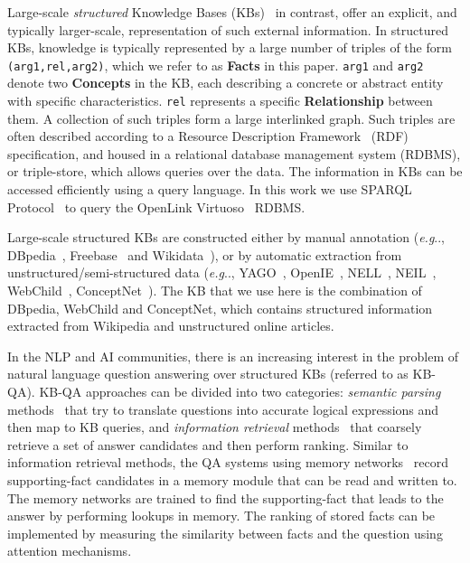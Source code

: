 \documentclass[10pt,journal]{IEEEtran}
\makeatletter
\DeclareRobustCommand\onedot{\futurelet\@let@token\@onedot}
\def\@onedot{\ifx\@let@token.\else.\null\fi\xspace}
\def\eg{\emph{e.g}\onedot} \def\Eg{\emph{E.g}\onedot}
\def\bluett{}
\makeatother
\begin{document}
Large-scale {\em structured} Knowledge Bases
(KBs)~\cite{auer2007dbpedia,banko2007open,bollacker2008freebase,carlson2010toward,chen2013neil,mahdisoltani2014yago3,vrandevcic2014wikidata}
in contrast, offer an explicit, and typically larger-scale, representation of
such external information. In structured KBs, knowledge is typically represented by a large number of triples of the form \texttt{(arg1,rel,arg2)}, which we refer to as {\bf Facts} in this paper.
\texttt{arg1} and \texttt{arg2} denote two {\bf Concepts} in the KB,
each describing a concrete or abstract entity with specific characteristics.
\texttt{rel} represents a specific {\bf Relationship} between them.
A collection of such triples form a large interlinked graph. Such triples are often described according to a Resource Description Framework~\cite{rdf2014resource} (RDF) specification, and housed in a relational database management system (RDBMS), or triple-store, which allows queries over the data.
The information in KBs can be accessed efficiently using a query language.
In this work we use SPARQL Protocol~\cite{prud2008sparql} to query the OpenLink Virtuoso~\cite{erling2012virtuoso} RDBMS.

Large-scale structured KBs are constructed either by manual annotation
(\eg, DBpedia~\cite{auer2007dbpedia}, Freebase~\cite{bollacker2008freebase} and Wikidata~\cite{vrandevcic2014wikidata}), or by automatic extraction from unstructured/semi-structured data (\eg, YAGO~\cite{hoffart2013yago2,mahdisoltani2014yago3}, OpenIE~\cite{banko2007open,etzioni2011open,fader2011identifying}, NELL~\cite{carlson2010toward}, NEIL~\cite{chen2013neil},
WebChild~\cite{tandon2014acquiring}, ConceptNet~\cite{liu2004conceptnet}). The KB that we use here is the combination of DBpedia, WebChild and ConceptNet, which contains structured information extracted from Wikipedia and unstructured online articles.

\bluett{
In the NLP and AI communities, there is an increasing interest in the problem of natural language question answering over structured KBs (referred to as KB-QA). KB-QA approaches can be divided into two categories: {\em semantic parsing} methods~\cite{zettlemoyer2012learning,zettlemoyer2009learning,berant2013semantic,cai2013large,liang2013learning,kwiatkowski2013scaling,berant2014semantic,fader2014open,yih2015semantic,reddy2016transforming,xiao2016sequence} that
try to translate questions into accurate logical expressions and then map to KB queries, and
{\em information retrieval} methods~\cite{unger2012template,kolomiyets2011survey,yao2014information,bordes2014question,bordes2014open,dong2015question,bordes2015large} that coarsely retrieve a set of answer candidates and then perform ranking.
Similar to information retrieval methods, the QA systems using memory networks~\cite{weston2014memory,sukhbaatar2015end,bordes2015large,kumar2016ask,xiong2016dynamic} record
supporting-fact candidates in a memory module that can be read and written to.
The memory networks are trained to find the supporting-fact that leads to the answer by performing lookups in memory.
The ranking of stored facts can be implemented by measuring the similarity between facts and the question 
using attention mechanisms.
}
\end{document}
